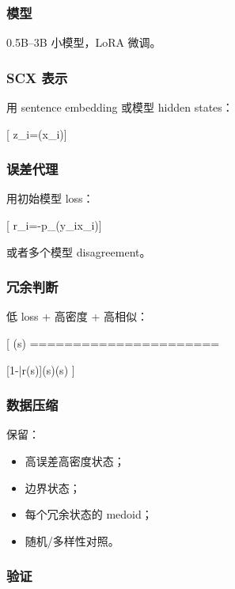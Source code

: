 \documentclass[
  12pt,
]{ctexart}
\providecommand{\tightlist}{%
  \setlength{\itemsep}{0pt}\setlength{\parskip}{0pt}}
\begin{document}
\subsubsection{模型}\label{ux6a21ux578b}

0.5B--3B 小模型，LoRA 微调。

\subsubsection{SCX 表示}\label{scx-ux8868ux793a}

用 sentence embedding 或模型 hidden states：

{[} z\_i=\phi(x\_i){]}

\subsubsection{误差代理}\label{ux8befux5deeux4ee3ux7406}

用初始模型 loss：

{[} r\_i=-\log p\_\theta(y\_i\mid x\_i){]}

或者多个模型 disagreement。

\subsubsection{冗余判断}\label{ux5197ux4f59ux5224ux65ad}

低 loss + 高密度 + 高相似：

{[} (s) ======================

{[}1-\bar r(s){]}\rho(s)(s) {]}

\subsubsection{数据压缩}\label{ux6570ux636eux538bux7f29}

保留：

\begin{itemize}
\tightlist
\item
  高误差高密度状态；
\item
  边界状态；
\item
  每个冗余状态的 medoid；
\item
  随机/多样性对照。
\end{itemize}

\subsubsection{验证}\label{ux9a8cux8bc1}
\end{document}
